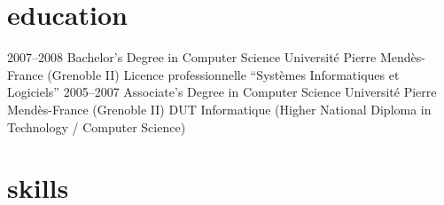 \documentclass[]{friggeri-cv} %
\begin{document}
\section{education}

\begin{entrylist}
\entry
{2007--2008}
{Bachelor's Degree {\normalfont in Computer Science}}
{Université Pierre Mendès-France (Grenoble II)}
{Licence professionnelle ``Systèmes Informatiques et Logiciels''}
\entry
{2005--2007}
{Associate's Degree {\normalfont in Computer Science}}
{Université Pierre Mendès-France (Grenoble II)}
{DUT Informatique (Higher National Diploma in Technology / Computer Science)}
\end{entrylist}

\newpage


\section{skills}
\end{document}
